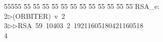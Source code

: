 %
%
\begin{tabbing}
55555 \= 55 \= 55 \= 55 \= 55 \= 55 \= 55 \= 55 \= 55 \= 55 \= 55 \= 55 \= 55 \= \>RSA\_e:\\[0pt]
2\>$\triangleright$\>(ORBITER)\ v\ 2\ \\[0pt]
3\>$\triangleright$\>$\triangleright$\>RSA\ 59\ 10403\ 2\ 19211605180421160518\\[0pt]
4\>\end{tabbing}
